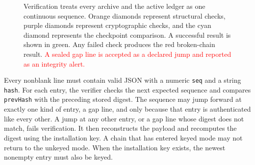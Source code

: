 \begin{figure}[htbp]
{%
}
\caption[Verification of the complete audit chain]
{\footnotesize Verification treats every archive and the active ledger as one
continuous sequence. Orange diamonds represent structural checks, purple
diamonds represent cryptographic checks, and the cyan diamond represents the
checkpoint comparison. A successful result is shown in green. Any failed check
produces the red broken-chain result. \textcolor{red}{A sealed gap line is
accepted as a declared jump and reported as an integrity alert.}}
\label{fig:gov-ledger-verify}
\end{figure}


Every nonblank line must contain valid JSON with a numeric \texttt{seq} and a string \texttt{hash}. For each entry, the verifier checks the next expected sequence and compares \texttt{prevHash} with the preceding stored digest. {\color{red}The sequence may jump forward at exactly one kind of entry, a gap line, and only because that entry is authenticated like every other. A jump at any other entry, or a gap line whose digest does not match, fails verification.} It then reconstructs the payload and recomputes the digest using the installation key. A chain that has entered keyed mode may not return to the unkeyed mode. When the installation key exists, the newest nonempty entry must also be keyed.

